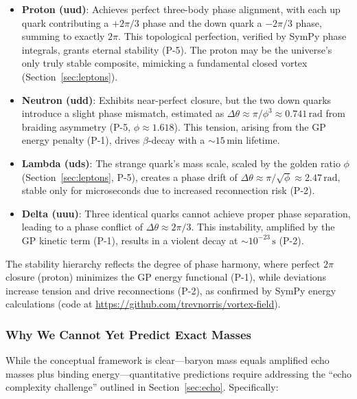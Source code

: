 \begin{itemize}
\item \textbf{Proton (uud)}: Achieves perfect three-body phase alignment, with each up quark contributing a $+2\pi/3$ phase and the down quark a $-2\pi/3$ phase, summing to exactly $2\pi$. This topological perfection, verified by SymPy phase integrals, grants eternal stability (P-5). The proton may be the universe's only truly stable composite, mimicking a fundamental closed vortex (Section~\ref{sec:leptons}).
\item \textbf{Neutron (udd)}: Exhibits near-perfect closure, but the two down quarks introduce a slight phase mismatch, estimated as $\Delta \theta \approx \pi / \phi^3 \approx 0.741 \, \text{rad}$ from braiding asymmetry (P-5, $\phi \approx 1.618$). This tension, arising from the GP energy penalty (P-1), drives $\beta$-decay with a $\sim 15 \, \text{min}$ lifetime.
\item \textbf{Lambda (uds)}: The strange quark's mass scale, scaled by the golden ratio $\phi$ (Section~\ref{sec:leptons}, P-5), creates a phase drift of $\Delta \theta \approx \pi / \sqrt{\phi} \approx 2.47 \, \text{rad}$, stable only for microseconds due to increased reconnection risk (P-2).
\item \textbf{Delta (uuu)}: Three identical quarks cannot achieve proper phase separation, leading to a phase conflict of $\Delta \theta \approx 2\pi/3$. This instability, amplified by the GP kinetic term (P-1), results in a violent decay at $\sim 10^{-23} \, \text{s}$ (P-2).
\end{itemize}

The stability hierarchy reflects the degree of phase harmony, where perfect $2\pi$ closure (proton) minimizes the GP energy functional (P-1), while deviations increase tension and drive reconnections (P-2), as confirmed by SymPy energy calculations (code at \url{https://github.com/trevnorris/vortex-field}).

\subsubsection{Why We Cannot Yet Predict Exact Masses}

While the conceptual framework is clear—baryon mass equals amplified echo masses plus binding energy—quantitative predictions require addressing the ``echo complexity challenge'' outlined in Section~\ref{sec:echo}. Specifically:

